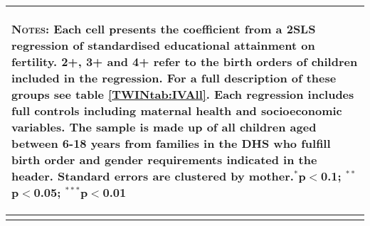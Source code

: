 \begin{table}[!htbp]
\begin{tabular}{lcccccc}
\midrule\multicolumn{7}{p{12.8cm}}{\begin{footnotesize}\textsc{Notes:} Each cell presents the coefficient from a 2SLS regression of standardised educational attainment on fertility.  2+, 3+ and 4+ refer to the birth orders of children included in the regression.  For a full description of these groups see table \ref{TWINtab:IVAll}.  Each regression includes full controls including maternal health and socioeconomic variables.  The sample is made up of all children aged between 6-18 years from families in the DHS who fulfill birth order and gender requirements indicated in the header.  Standard errors are clustered by mother.$^{*}$p$<$0.1; $^{**}$p$<$0.05; $^{***}$p$<$0.01 
\end{footnotesize}}
\\\bottomrule\normalsize\end{tabular}\end{table} 

